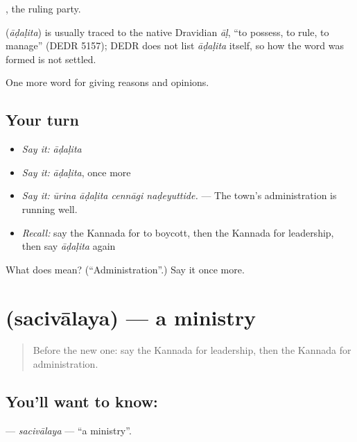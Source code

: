  , the ruling party.

\begin{cousinweb}
\textbf{} (\emph{āḍaḷita}) is usually traced to the native Dravidian \emph{āḷ}, \textquotedblleft{}to possess, to rule, to manage\textquotedblright{} (DEDR 5157); DEDR does not list \emph{āḍaḷita} itself, so how the word was formed is not settled.
\end{cousinweb}

\begin{grammarlens}[title={What you've built}]
One more word for giving reasons and opinions.
\end{grammarlens}

\subsection*{Your turn}
\begin{itemize}
\raggedright
  \item \emph{Say it:} \emph{āḍaḷita}
  \item \emph{Say it:} \emph{āḍaḷita}, once more
  \item \emph{Say it:} \emph{ūrina āḍaḷita cennāgi naḍeyuttide.} — The town's administration is running well.
  \item \emph{Recall:} say the Kannada for to boycott, then the Kannada for leadership, then say \emph{āḍaḷita} again
\end{itemize}

\begin{tcolorbox}[breakable,colback=teal!4,colframe=teal!35!black,title={Before you move on}]
What does  mean? (\textquotedblleft{}Administration\textquotedblright{}.) Say it once more.
\end{tcolorbox}
\section[\texorpdfstring{\kn{ಸಚಿವಾಲಯ} (sacivālaya)}{ಸಚಿವಾಲಯ (sacivālaya)}]{ (sacivālaya) — a ministry}

\label{lesson:KA-C395-sacivalaya}



\begin{quote}
Before the new one: say the Kannada for leadership, then the Kannada for administration.
\end{quote}

\subsection*{You'll want to know: }
\textbf{} — \emph{sacivālaya} — \textquotedblleft{}a ministry\textquotedblright{}.

